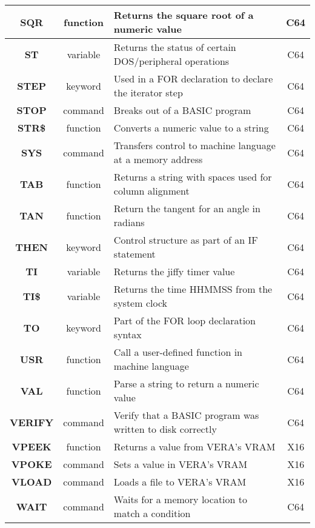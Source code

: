 \begin{longtable}{|c|c|m{4cm}|c|}
	{\bfseries SQR} & function & Returns the square root of a numeric value & C64 \\ \hline
	{\bfseries ST} & variable & Returns the status of certain DOS/peripheral operations & C64 \\ \hline
	{\bfseries STEP} & keyword & Used in a {\ttfamily FOR} declaration to declare the iterator step & C64 \\ \hline
	{\bfseries STOP} & command & Breaks out of a BASIC program & C64 \\ \hline
	{\bfseries STR\$} & function & Converts a numeric value to a string & C64 \\ \hline
	{\bfseries SYS} & command & Transfers control to machine language at a memory address & C64 \\ \hline
	{\bfseries TAB} & function & Returns a string with spaces used for column alignment & C64 \\ \hline
	{\bfseries TAN} & function & Return the tangent for an angle in radians & C64 \\ \hline
	{\bfseries THEN} & keyword & Control structure as part of an {\ttfamily IF} statement & C64 \\ \hline
	{\bfseries TI} & variable & Returns the jiffy timer value & C64 \\ \hline
	{\bfseries TI\$} & variable & Returns the time HHMMSS from the system clock & C64 \\ \hline
	{\bfseries TO} & keyword & Part of the {\ttfamily FOR} loop declaration syntax & C64 \\ \hline
	{\bfseries USR} & function & Call a user-defined function in machine language & C64 \\ \hline
	{\bfseries VAL} & function & Parse a string to return a numeric value & C64 \\ \hline
	{\bfseries VERIFY} & command & Verify that a BASIC program was written to disk correctly & C64 \\ \hline
	{\bfseries VPEEK} & function & Returns a value from VERA's VRAM & X16 \\ \hline
	{\bfseries VPOKE} & command & Sets a value in VERA's VRAM & X16 \\ \hline
	{\bfseries VLOAD} & command & Loads a file to VERA's VRAM & X16 \\ \hline
	{\bfseries WAIT} & command & Waits for a memory location to match a condition & C64 \\ \hline
\end{longtable}
